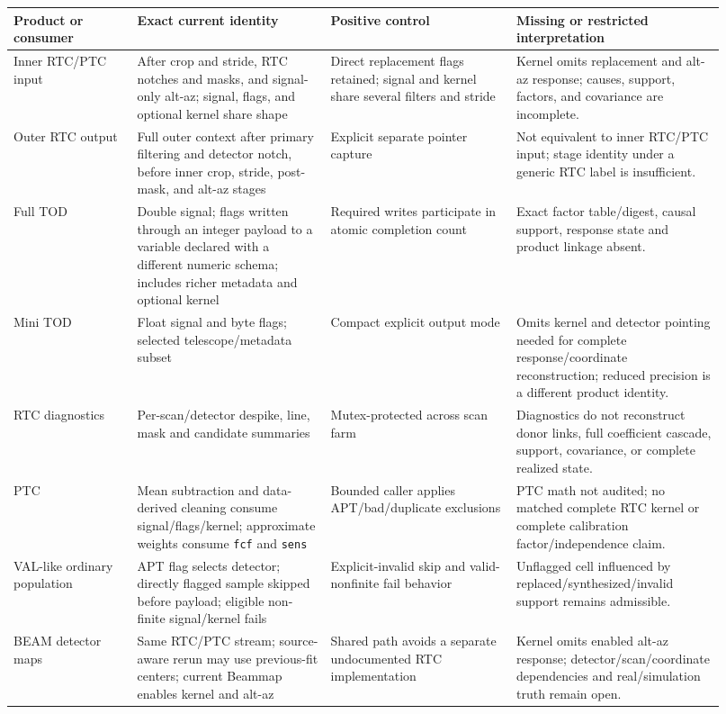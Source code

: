 \documentclass[11pt]{article}
\newcommand{\code}[1]{\nolinkurl{#1}}
\begin{document}
\begin{longtable}{@{}L{0.16\linewidth}L{0.25\linewidth}L{0.24\linewidth}L{0.27\linewidth}@{}}
\toprule
Product or consumer & Exact current identity & Positive control & Missing or restricted interpretation \\
\midrule
\endhead
Inner RTC/PTC input & After crop and stride, RTC notches and masks, and signal-only alt-az; signal, flags, and optional kernel share shape & Direct replacement flags retained; signal and kernel share several filters and stride & Kernel omits replacement and alt-az response; causes, support, factors, and covariance are incomplete. \\
Outer RTC output & Full outer context after primary filtering and detector notch, before inner crop, stride, post-mask, and alt-az stages & Explicit separate pointer capture & Not equivalent to inner RTC/PTC input; stage identity under a generic RTC label is insufficient. \\
Full TOD & Double signal; flags written through an integer payload to a variable declared with a different numeric schema; includes richer metadata and optional kernel & Required writes participate in atomic completion count & Exact factor table/digest, causal support, response state and product linkage absent. \\
Mini TOD & Float signal and byte flags; selected telescope/metadata subset & Compact explicit output mode & Omits kernel and detector pointing needed for complete response/coordinate reconstruction; reduced precision is a different product identity. \\
RTC diagnostics & Per-scan/detector despike, line, mask and candidate summaries & Mutex-protected across scan farm & Diagnostics do not reconstruct donor links, full coefficient cascade, support, covariance, or complete realized state. \\
PTC & Mean subtraction and data-derived cleaning consume signal/flags/kernel; approximate weights consume \code{fcf} and \code{sens} & Bounded caller applies APT/bad/duplicate exclusions & PTC math not audited; no matched complete RTC kernel or complete calibration factor/independence claim. \\
VAL-like ordinary population & APT flag selects detector; directly flagged sample skipped before payload; eligible non-finite signal/kernel fails & Explicit-invalid skip and valid-nonfinite fail behavior & Unflagged cell influenced by replaced/synthesized/invalid support remains admissible. \\
BEAM detector maps & Same RTC/PTC stream; source-aware rerun may use previous-fit centers; current Beammap enables kernel and alt-az & Shared path avoids a separate undocumented RTC implementation & Kernel omits enabled alt-az response; detector/scan/coordinate dependencies and real/simulation truth remain open. \\
\bottomrule
\end{longtable}
\end{document}
